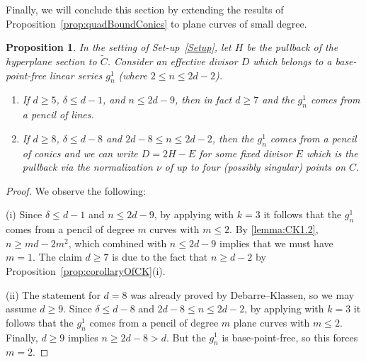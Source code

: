 \documentclass[fontsize=11pt,reqno]{amsart}
\newtheorem{proposition}[thm]{Proposition}
\theoremstyle{definition}
\theoremstyle{remark}
\newcommand{\tC}{\widetilde{C}}
\begin{document}
Finally, we will conclude this section by extending the results of Proposition~\ref{prop:quadBoundConics} to plane curves of small degree.

\begin{proposition}\label{prop:linearBoundConics}
    In the setting of Set-up~\ref{Setup}, let $H$ be the pullback of the hyperplane section to $\tC$. Consider an effective divisor $D$ which belongs to a base-point-free linear series $g^{1}_{n}$ (where $2\leq n \leq 2d-2$).
    
    \begin{enumerate}[topsep=-1ex,itemsep=-0.5ex,partopsep=1ex,parsep=1ex]
        \item[(i)] If $d\geq 5$, $\delta \leq d-1$, and $n\leq 2d-9$, then in fact $d \geq 7$ and the $g^{1}_{n}$ comes from a pencil of lines.
        
        \item[(ii)] If $d\geq 8$, $\delta \leq d-8$ and $2d-8 \leq n \leq 2d-2$, then the $g^{1}_{n}$ comes from a pencil of conics and we can write $D = 2H - E$ for some fixed divisor $E$ which is the pullback via the normalization $\nu$ of up to four (possibly singular) points on $C$.
    \end{enumerate}
\end{proposition}

\begin{proof}
We observe the following:

(i) Since $\delta \leq d-1$ and $n\leq 2d-9$, by applying \cite[Main Lemma]{CK91correction} with $k=3$ it follows that the $g^{1}_{n}$ comes from a pencil of degree $m$ curves with $m \leq 2$. By \cref{lemma:CK1.2}, $n \geq md - 2m^{2}$, which combined with $n \leq 2d-9$ implies that we must have $m = 1$. The claim $d \geq 7$ is due to the fact that $n \geq d-2$ by Proposition~\ref{prop:corollaryOfCK}(i).
    
(ii) The statement for $d = 8$ was already proved by Debarre--Klassen, so we may assume $d \geq 9$. Since $\delta \leq d-8$ and $2d-8 \leq n \leq 2d-2$, by applying \cite[Main Lemma]{CK91correction} with $k=3$ it follows that the $g^{1}_{n}$ comes from a pencil of degree $m$ plane curves with $m \leq 2$. Finally, $d \geq 9$ implies $n \geq 2d-8 > d$. But the $g^{1}_{n}$ is base-point-free, so this forces $m = 2$. \qedhere
\end{proof}



\end{document}
